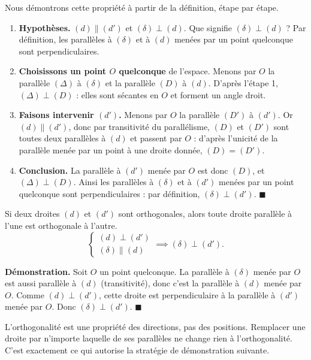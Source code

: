\documentclass[11pt]{article}
\newcommand{\cle}[1]{{\popxbold\color{popdark}#1}}
\begin{document}
\begin{experience}
Nous démontrons cette propriété à partir de la définition, étape par étape.
\begin{enumerate}
\item \textbf{Hypothèses.} $(d)\parallel(d')$ et $(\delta)\perp(d)$. Que signifie $(\delta)\perp(d)$ ? Par définition, les parallèles à $(\delta)$ et à $(d)$ menées par un point quelconque sont perpendiculaires.
\item \textbf{Choisissons un point $O$ quelconque} de l'espace. Menons par $O$ la parallèle $(\Delta)$ à $(\delta)$ et la parallèle $(D)$ à $(d)$. D'après l'étape 1, $(\Delta)\perp(D)$ : elles sont sécantes en $O$ et forment un angle droit.
\item \textbf{Faisons intervenir $(d')$.} Menons par $O$ la parallèle $(D')$ à $(d')$. Or $(d)\parallel(d')$, donc par transitivité du parallélisme, $(D)$ et $(D')$ sont toutes deux parallèles à $(d)$ et passent par $O$ : d'après l'unicité de la parallèle menée par un point à une droite donnée, $(D)=(D')$.
\item \textbf{Conclusion.} La parallèle à $(d')$ menée par $O$ est donc $(D)$, et $(\Delta)\perp(D)$. Ainsi les parallèles à $(\delta)$ et à $(d')$ menées par un point quelconque sont perpendiculaires : par définition, $(\delta)\perp(d')$. $\blacksquare$
\end{enumerate}
\end{experience}

\begin{propriete}
Si deux droites $(d)$ et $(d')$ sont orthogonales, alors toute droite parallèle à l'une est orthogonale à l'autre.
\[ \begin{cases} (d)\perp(d') \\ (\delta)\parallel(d) \end{cases} \implies (\delta)\perp(d'). \]
\end{propriete}

\textbf{Démonstration.} Soit $O$ un point quelconque. La parallèle à $(\delta)$ menée par $O$ est aussi parallèle à $(d)$ (transitivité), donc c'est la parallèle à $(d)$ menée par $O$. Comme $(d)\perp(d')$, cette droite est perpendiculaire à la parallèle à $(d')$ menée par $O$. Donc $(\delta)\perp(d')$. $\blacksquare$

\begin{aretenir}
L'orthogonalité est une propriété des \cle{directions}, pas des positions. Remplacer une droite par n'importe laquelle de ses parallèles ne change rien à l'orthogonalité. C'est exactement ce qui autorise la stratégie de démonstration suivante.
\end{aretenir}
\end{document}
